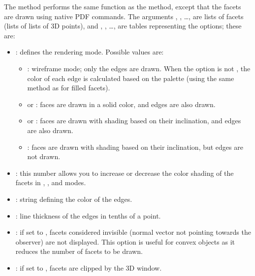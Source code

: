 The  method performs the same function as the  method, except that the facets are drawn using native PDF commands. The arguments , , \ldots, are lists of facets (lists of lists of 3D points), and , , \ldots, are tables representing the options; these are:
\begin{itemize}
    \item {} : defines the rendering mode. Possible values ​​are:
    \begin{itemize}
        \item {} : wireframe mode; only the edges are drawn. When the  option is not \nil, the color of each edge is calculated based on the palette (using the same method as for filled facets). 

        \item {} or  : faces are drawn in a solid color, and edges are also drawn. 

        \item {} or  : faces are drawn with shading based on their inclination, and edges are also drawn. 

        \item {} : faces are drawn with shading based on their inclination, but edges are not drawn. 
    \end{itemize}

    \item {} : this number allows you to increase or decrease the color shading of the facets in , , and  modes. 
    
    \item {} : string defining the color of the edges. 
    
    \item {} : line thickness of the edges in tenths of a point. 

    \item {} : if set to \true, facets considered invisible (normal vector not pointing towards the observer) are not displayed. This option is useful for convex objects as it reduces the number of facets to be drawn. 

    \item {} : if set to \true, facets are clipped by the 3D window. 


\end{itemize}
